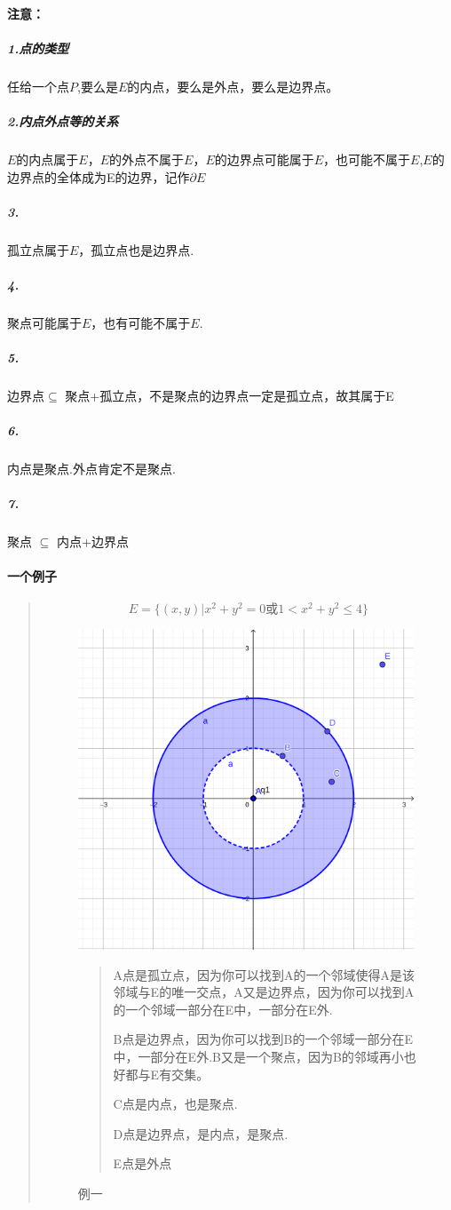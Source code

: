 \documentclass{ctexart}
\begin{document}
        \paragraph{注意：}
          \subparagraph{1.点的类型}任给一个点$P$,要么是$E$的内点，要么是外点，要么是边界点。
          \subparagraph{2.内点外点等的关系}$E$的内点属于$E$，$E$的外点不属于$E$，$E$的边界点可能属于$E$，也可能不属于$E$,$E$的边界点的全体成为E的边界，记作$\partial E$
          \subparagraph{3.}孤立点属于$E$，孤立点也是边界点.
          \subparagraph{4.}聚点可能属于$E$，也有可能不属于$E$.
          \subparagraph{5.}边界点$\subseteq$ 聚点+孤立点，不是聚点的边界点一定是孤立点，故其属于E
          \subparagraph{6.}内点是聚点.外点肯定不是聚点.
          \subparagraph{7.}聚点 $\subseteq$ 内点+边界点
        \paragraph{一个例子}
          \begin{quote}
            $$E = \{(x,y)|x^2+y^2 = 0 或 1 < x^2+y^2 \leq 4\}$$
            \begin{figure}[p]
            \centering
            \caption{例一}
            \includegraphics[width=10cm]{./PictureNote/Eg1.png}
              \begin{quote}
              A点是孤立点，因为你可以找到A的一个邻域使得A是该邻域与E的唯一交点，A又是边界点，因为你可以找到A的一个邻域一部分在E中，一部分在E外. 
              
              B点是边界点，因为你可以找到B的一个邻域一部分在E中，一部分在E外.B又是一个聚点，因为B的邻域再小也好都与E有交集。

              C点是内点，也是聚点.

              D点是边界点，是内点，是聚点.

              E点是外点
              \end{quote}
            \end{figure}
        \end{quote}
          
\end{document}
